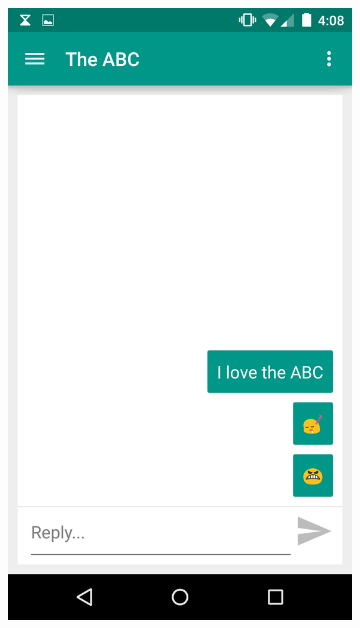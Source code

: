 \documentclass[11pt,english,numbers=endperiod,parskip=half]{scrartcl}
\begin{document}
  \begin{figure}[H]
    \centering
    \begin{subfigure}{.5\textwidth}
      \centering
      \includegraphics[width=.7\linewidth]{images/ss3.png}
    \end{subfigure}%
    \begin{subfigure}{.5\textwidth}
      \centering

\end{subfigure}
\end{figure}
\end{document}

